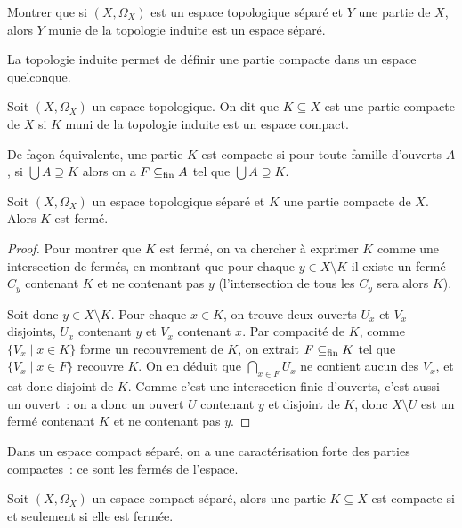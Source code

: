 \begin{exercise}
  Montrer que si $(X,\Omega_X)$ est un espace topologique séparé et $Y$ une
  partie de $X$, alors $Y$ munie de la topologie induite est un espace séparé.
\end{exercise}

La topologie induite permet de définir une partie compacte dans un espace
quelconque.

\begin{definition}
  Soit $(X,\Omega_X)$ un espace topologique. On dit que $K\subseteq X$ est une
  partie compacte de $X$ si $K$ muni de la topologie induite est un espace
  compact.
\end{definition}

\begin{remark}
  De façon équivalente, une partie $K$ est compacte si pour toute famille
  d'ouverts $A$, si $\bigcup A \supseteq K$ alors on a $F\subseteq_{\mathrm{fin}} A$ tel que
  $\bigcup A \supseteq K$.
\end{remark}

\begin{property}
  Soit $(X,\Omega_X)$ un espace topologique séparé et $K$ une partie compacte de
  $X$. Alors $K$ est fermé.
\end{property}

\begin{proof}
  Pour montrer que $K$ est fermé, on va chercher à exprimer $K$ comme une
  intersection de fermés, en montrant que pour chaque $y\in X\setminus K$ il
  existe un fermé $C_y$ contenant $K$ et ne contenant pas $y$ (l'intersection
  de tous les $C_y$ sera alors $K$).

  Soit donc $y\in X\setminus K$. Pour chaque $x\in K$, on trouve deux ouverts
  $U_x$ et $V_x$ disjoints, $U_x$ contenant $y$ et $V_x$ contenant $x$. Par
  compacité de $K$, comme $\{V_x\mid x \in K\}$ forme un recouvrement de $K$,
  on extrait $F\subseteq_{\mathrm{fin}} K$ tel que $\{V_x\mid x \in F\}$ recouvre $K$.
  On en déduit que $\displaystyle\bigcap_{x\in F}U_x$ ne contient aucun des
  $V_x$, et est donc disjoint de $K$. Comme c'est une intersection finie
  d'ouverts, c'est aussi un ouvert~: on a donc un ouvert $U$ contenant
  $y$ et disjoint de $K$, donc $X\setminus U$ est un fermé contenant $K$ et
  ne contenant pas $y$.
\end{proof}

Dans un espace compact séparé, on a une caractérisation forte des parties
compactes~: ce sont les fermés de l'espace.

\begin{proposition}\label{prop.compac.equiv.ferme}
  Soit $(X,\Omega_X)$ un espace compact séparé, alors une partie $K\subseteq X$
  est compacte si et seulement si elle est fermée.
\end{proposition}

